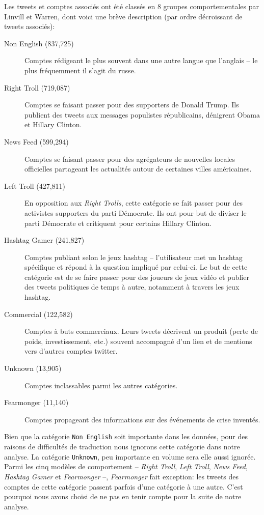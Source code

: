 \documentclass[twocolumn,10pt]{article}
\begin{document}
Les tweets et comptes associés ont été classés en 8 groupes comportementales par Linvill et Warren, dont voici une brève description (par ordre décroissant de tweets associés):
\begin{description}
\item[Non English (837,725)] Comptes rédigeant le plus souvent dans une autre langue que l'anglais -- le plus fréquemment il s'agit du russe.

\item[Right Troll (719,087)] Comptes se faisant passer pour des supporters de Donald Trump. Ils publient des tweets aux messages populistes républicains, dénigrent Obama et Hillary Clinton.
\item[News Feed (599,294)]  Comptes se faisant passer pour des agrégateurs de nouvelles locales officielles partageant les actualités autour de certaines villes américaines.
\item[Left Troll (427,811)] En opposition aux \textit{Right Trolls}, cette catégorie se fait passer pour des activistes supporters du parti Démocrate. Ils ont pour but de diviser le parti Démocrate et critiquent pour certains Hillary Clinton.
\item[Hashtag Gamer (241,827)] Comptes publiant selon le jeux hashtag -- l'utilisateur met un hashtag spécifique et répond à la question impliqué par celui-ci. Le but de cette catégorie est de se faire passer pour des joueurs de jeux vidéo et publier des tweets politiques de temps à autre, notamment à travers les jeux hashtag.
\item[Commercial (122,582)] Comptes à buts commerciaux. Leurs tweets décrivent un produit (perte de poids, investissement, etc.) souvent accompagné d'un lien et de mentions vers d'autres comptes twitter.
\item[Unknown (13,905)] Comptes inclassables parmi les autres catégories.
\item[Fearmonger (11,140)] Comptes propageant des informations sur des événements de crise inventés.
\end{description}

Bien que la catégorie \verb!Non English! soit importante dans les données, pour des raisons de difficultés de traduction nous ignorons cette catégorie dans notre analyse. La catégorie \verb!Unknown!, peu importante en volume sera elle aussi ignorée. Parmi les cinq modèles de comportement -- \textit{Right Troll}, \textit{Left Troll}, \textit{News Feed}, \textit{Hashtag Gamer} et \textit{Fearmonger} --,  \textit{Fearmonger} fait exception: les tweets des comptes de cette catégorie passent parfois d'une catégorie à une autre. C'est pourquoi nous avons choisi de ne pas en tenir compte pour la suite de notre analyse.
\end{document}
